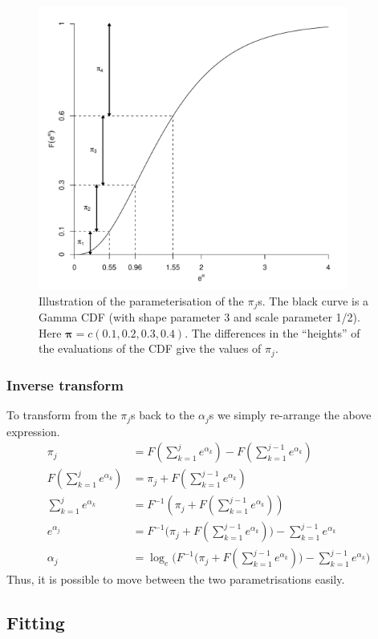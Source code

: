 \begin{figure}
\centering
\includegraphics[width=4in]{mix/figs/pidia.pdf}
\caption{Illustration of the parameterisation of the $\pi_j$s. The black curve is a Gamma CDF (with shape parameter 3 and scale parameter 1/2). Here $\bm{\pi}=c(0.1,0.2,0.3,0.4)$. The differences in the ``heights'' of the evaluations of the CDF give the values of $\pi_j$.}
\label{dlbpi}
\end{figure}

\subsubsection{Inverse transform}
To transform from the $\pi_j$s back to the $\alpha_j$s we simply re-arrange the above expression.
\begin{align*}
\pi_j &= F(\sum_{k=1}^j e^{\alpha_k}) - F(\sum_{k=1}^{j-1} e^{\alpha_k})\\
F(\sum_{k=1}^j e^{\alpha_k}) &= \pi_j + F(\sum_{k=1}^{j-1} e^{\alpha_k})\\
\sum_{k=1}^j e^{\alpha_k} &= F^{-1}(\pi_j + F(\sum_{k=1}^{j-1} e^{\alpha_k}))\\
e^{\alpha_j} &= F^{-1}\Big(\pi_j + F(\sum_{k=1}^{j-1} e^{\alpha_k})\Big) - \sum_{k=1}^{j-1} e^{\alpha_k}\\
\alpha_j &= \log_e \Big(F^{-1}\Big(\pi_j + F(\sum_{k=1}^{j-1} e^{\alpha_k})\Big) - \sum_{k=1}^{j-1} e^{\alpha_k}\Big)
\end{align*}
Thus, it is possible to move between the two parametrisations easily.

\subsection{Fitting}




